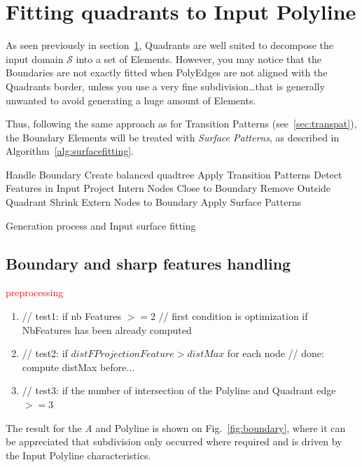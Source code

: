\documentclass[10pt]{article}
\begin{document}
\section{Fitting quadrants to Input Polyline}
\label{sec:method}

As seen previously in section~\ref{sec:method}, Quadrants are well suited to decompose the input  domain $\mathcal{S}$ into a set of Elements. However, you may notice that the Boundaries are not exactly fitted when PolyEdges are not aligned with the Quadrants border, unless you use a very fine subdivision\ldots that is generally unwanted to avoid generating a huge amount of Elements.

Thus, following the same approach as for Transition Patterns (see~\ref{sec:transpat}), the Boundary Elements will be treated with \textit{Surface Patterns}, as described in Algorithm~\ref{alg:surfacefitting}.\\

\begin{algorithm}[H]
%
\setcounter{AlgoLine}{-1}
\SetAlgoLined
{}
\nl   Handle Boundary\; \label{alg:bound2}
\nl {}
 \nl Create balanced quadtree\; \label{alg:goto2}
 \nl Apply Transition Patterns\;
 \nl Detect Features in Input\;
 \nl  Project Intern Nodes Close to Boundary\; \label{alg:closeto2}
  \nl Remove Outside Quadrant\; \label{alg:remsur2}
  \nl Shrink Extern Nodes to Boundary\; \label{alg:shrink2}
 \nl Apply Surface Patterns\; \label{alg:surfpat2}
 \caption{Generation process and Input surface fitting}
 \label{alg:surfacefitting}
\end{algorithm}

\subsection{Boundary and sharp features handling}
\label{sec:boundary}

\textcolor{red}{preprocessing}

\begin{enumerate}
\item        // test1: if nb Features $>= 2$
        // first condition is optimization if NbFeatures has been already computed
\item        // test2: if $distFProjectionFeature > distMax$ for each node
        // done: compute distMax before...
\item        // test3: if the number of intersection of the Polyline and Quadrant edge $>= 3$
\end{enumerate}
The result for the \textit{A} and  Polyline is shown on Fig.~\ref{fig:boundary}, where it can be appreciated that subdivision only occurred where required and is driven by the Input Polyline characteristics.
\end{document}
